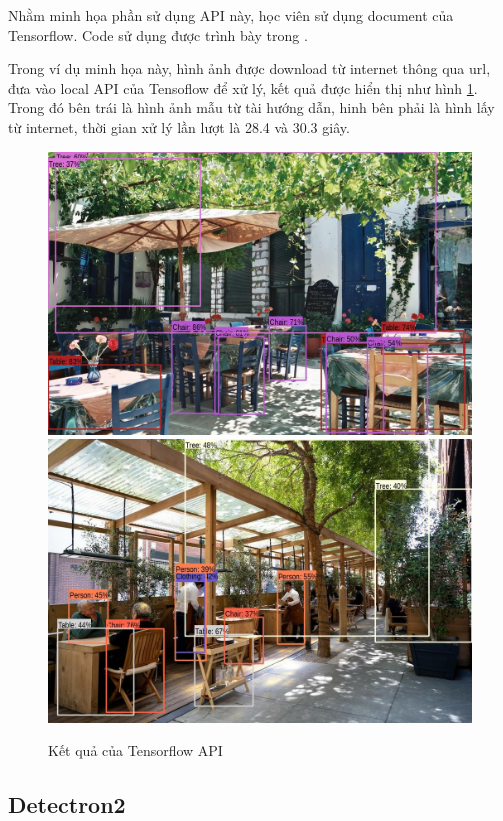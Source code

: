 Nhằm minh họa phần sử dụng API này, học viên sử dụng document của Tensorflow\cite{tensorflowapi}. Code sử dụng được trình bày trong \cite{tensorflowcode}.

Trong ví dụ minh họa này, hình ảnh được download từ internet thông qua url, đưa vào local API của Tensoflow để xử lý, kết quả được hiển thị như hình \ref{fig:tensor_result}. Trong đó bên trái là hình ảnh mẫu từ tài hướng dẫn, hinh bên phải là hình lấy từ internet, thời gian xử lý lần lượt là 28.4 và 30.3 giây.

\begin{figure}
    \centering
    \includegraphics[scale=0.25]{../code/processed/processed.jpg}\includegraphics[scale=0.25]{../code/processed/my_image.jpg}
    \caption{Kết quả của Tensorflow API}
    \label{fig:tensor_result}
\end{figure}

\subsection{Detectron2}

